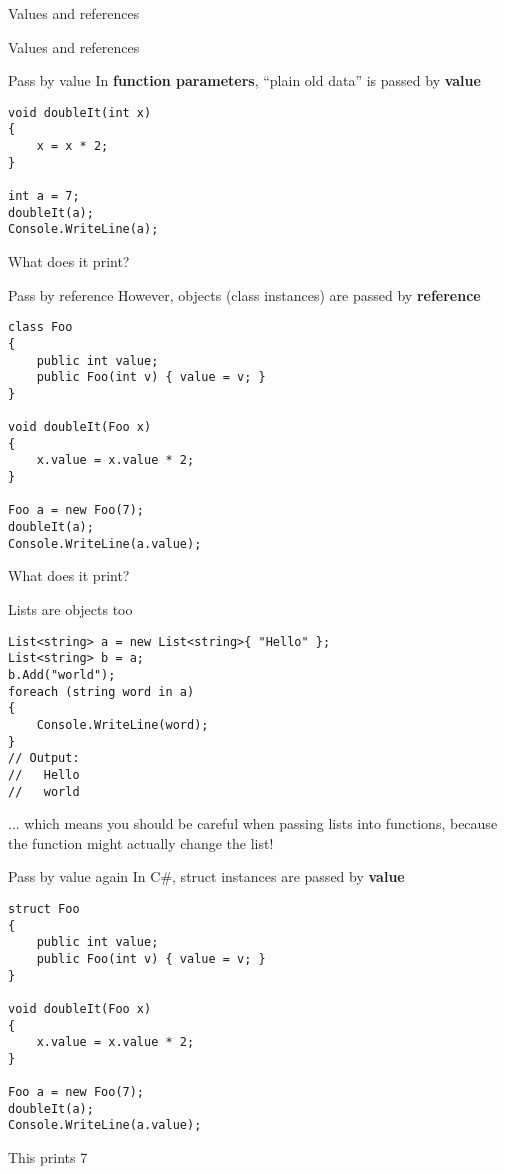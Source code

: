 \begin{frame}{Values and references}
	\socrative
	
\end{frame}

\begin{frame}{Values and references}
	\socrative
	
\end{frame}

\begin{frame}[fragile]{Pass by value}
	\socrative
	In \textbf{function parameters},
	``plain old data'' is passed by \textbf{value}
	\pause
	\begin{lstlisting}
void doubleIt(int x)
{
	x = x * 2;
}

int a = 7;
doubleIt(a);
Console.WriteLine(a);
	\end{lstlisting}
	\pause
	What does it print?
\end{frame}

\begin{frame}[fragile]{Pass by reference}
	\socrative
	However, objects (class instances) are passed by \textbf{reference}
	\pause
	\begin{lstlisting}
class Foo
{
	public int value;
	public Foo(int v) { value = v; }
}

void doubleIt(Foo x)
{
    x.value = x.value * 2;
}

Foo a = new Foo(7);
doubleIt(a);
Console.WriteLine(a.value);
	\end{lstlisting}
	\pause
	What does it print?
\end{frame}

\begin{frame}[fragile]{Lists are objects too}
	\pause
	\begin{lstlisting}
List<string> a = new List<string>{ "Hello" };
List<string> b = a;
b.Add("world");
foreach (string word in a)
{
	Console.WriteLine(word);
}
// Output:
//   Hello
//   world
\end{lstlisting}
	\pause
	... which means you should be careful when passing lists into functions,
	because the function might actually change the list!
\end{frame}

\begin{frame}[fragile]{Pass by value again}
	In C\#, struct instances are passed by \textbf{value}
	\pause
	\begin{lstlisting}
struct Foo
{
	public int value;
	public Foo(int v) { value = v; }
}

void doubleIt(Foo x)
{
    x.value = x.value * 2;
}

Foo a = new Foo(7);
doubleIt(a);
Console.WriteLine(a.value);
	\end{lstlisting}
	\pause
	This prints 7
\end{frame}

